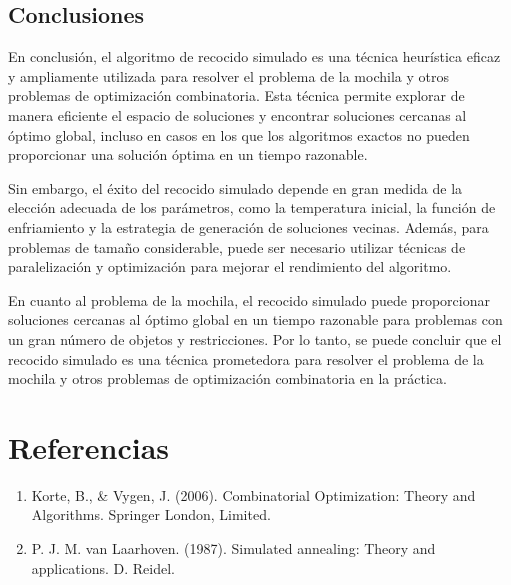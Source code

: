 \documentclass{article}
\begin{document}
\subsection*{Conclusiones}
En conclusión, el algoritmo de recocido simulado es una técnica heurística eficaz y ampliamente utilizada para resolver el problema de la mochila y otros problemas de optimización combinatoria. Esta técnica permite explorar de manera eficiente el espacio de soluciones y encontrar soluciones cercanas al óptimo global, incluso en casos en los que los algoritmos exactos no pueden proporcionar una solución óptima en un tiempo razonable.

Sin embargo, el éxito del recocido simulado depende en gran medida de la elección adecuada de los parámetros, como la temperatura inicial, la función de enfriamiento y la estrategia de generación de soluciones vecinas. Además, para problemas de tamaño considerable, puede ser necesario utilizar técnicas de paralelización y optimización para mejorar el rendimiento del algoritmo.

En cuanto al problema de la mochila, el recocido simulado puede proporcionar soluciones cercanas al óptimo global en un tiempo razonable para problemas con un gran número de objetos y restricciones. Por lo tanto, se puede concluir que el recocido simulado es una técnica prometedora para resolver el problema de la mochila y otros problemas de optimización combinatoria en la práctica.

\newpage
\section*{Referencias}
\begin{enumerate}
	\item Korte, B., \& Vygen, J. (2006). Combinatorial Optimization: Theory and Algorithms. Springer London, Limited.
	\item P. J. M. van Laarhoven. (1987). Simulated annealing: Theory and applications. D. Reidel.
\end{enumerate}
\end{document}
